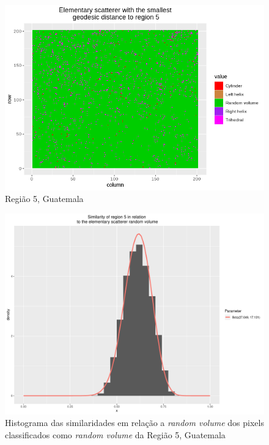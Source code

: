 \documentclass[12pt]{article}
\begin{document}
\begin{figure}[!h]
    \centering    
    \includegraphics[width = 0.77\linewidth]{../../Images/Report_18_12_20/Classifier_Geo_Dist/Class_Map/Guate/region5_predomain.png}
    \caption{Região 5, Guatemala}
    \label{fig:class_map_r5}
\end{figure}

\begin{figure}[!h]
    \centering   
    \includegraphics[width = 0.8\linewidth]{../../Images/Report_18_12_20/Classifier_Geo_Dist/Histograms/Guate/region5_rv_sm_filter.pdf}
    \caption{Histograma das similaridades em relação a \textit{random volume} dos pixels classificados como \textit{random volume} da Região 5, Guatemala}
    \label{fig:class_hist_r5_rv}
\end{figure}
\end{document}
